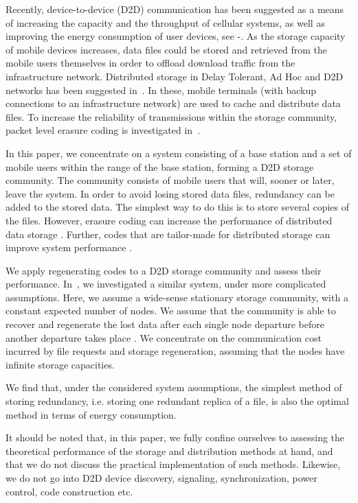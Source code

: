 \documentclass[10pt,conference]{IEEEtran}
\begin{document}
Recently, device-to-device (D2D) communication has been suggested as a
means of increasing the capacity and the throughput of cellular
systems, as well as improving the energy consumption of user devices,
see \cite{Kaufman}-\cite{belleschi}. As the storage capacity of
mobile devices increases, data files could be stored and retrieved from
the mobile users themselves in order to offload download traffic from the
infrastructure network. Distributed storage in Delay Tolerant, Ad Hoc
and D2D networks has been suggested
in~\cite{Ott2007,Lenders2007,golrezaei1}. In these, mobile terminals (with backup connections to an infrastructure network) are used to cache and distribute data files. To increase the
reliability of transmissions within the storage community, packet
level erasure coding is investigated in~\cite{pitkanen2007}.

In this paper, we concentrate on a system consisting of a base station and a
set of mobile users within the range of the base station, forming a
D2D storage community. The community consists of mobile users that will, sooner or later, leave the system. In order
to avoid losing stored data files, redundancy can be added to the stored data. The simplest way to do this is to store several copies of the files.
However, erasure coding can increase the performance of distributed data
storage \cite{compa}. Further, codes that are tailor-made for
distributed storage can improve system performance \cite{tailor}.

We apply regenerating codes \cite{dima} to a D2D
storage community and assess their performance. In~\cite{paakk}, we
investigated a similar system, under more complicated assumptions.
Here, we assume a wide-sense stationary storage community, with a
constant expected number of nodes. We assume that the community is able to recover and regenerate the lost data after each
single node departure before another departure takes place . We concentrate on the communication cost
incurred by file requests and storage regeneration, assuming that
the nodes have infinite storage capacities.

We find that, under the considered system assumptions, the simplest method of storing redundancy, i.e. storing one redundant replica of a file, is also the optimal method in terms of energy consumption.

It should be noted that, in this paper, we fully confine ourselves to assessing the theoretical performance of the storage and distribution methods at hand, and that we do not discuss the practical implementation of such methods. Likewise, we do not go into D2D device discovery, signaling, synchronization, power control, code construction etc.
\end{document}
